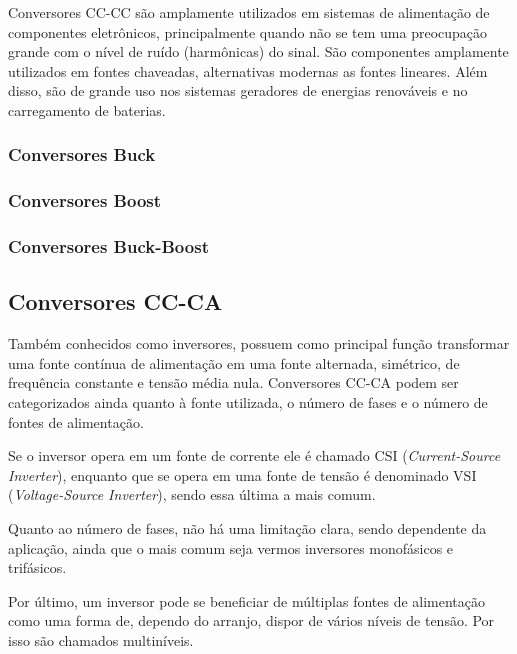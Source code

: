 Conversores CC-CC são amplamente utilizados em sistemas de alimentação de componentes eletrônicos, principalmente quando não se tem uma preocupação grande com o nível de ruído (harmônicas) do sinal. São componentes amplamente utilizados em fontes chaveadas, alternativas modernas as fontes lineares. Além disso, são de grande uso nos sistemas geradores de energias renováveis e no carregamento de baterias.

\subsubsection{Conversores Buck}


 
\subsubsection{Conversores Boost}


 
\subsubsection{Conversores Buck-Boost}


 
\subsection{Conversores CC-CA}

Também conhecidos como inversores, possuem como principal função transformar uma fonte contínua de alimentação em uma fonte alternada, simétrico, de frequência constante e tensão média nula. Conversores CC-CA podem ser categorizados ainda quanto à fonte utilizada, o número de fases e o número de fontes de alimentação.

Se o inversor opera em um fonte de corrente ele é chamado CSI (\emph{Current-Source Inverter}), enquanto que se opera em uma fonte de tensão é denominado VSI (\emph{Voltage-Source Inverter}), sendo essa última a mais comum.

Quanto ao número de fases, não há uma limitação clara, sendo dependente da aplicação, ainda que o mais comum seja vermos inversores monofásicos e trifásicos.

Por último, um inversor pode se beneficiar de múltiplas fontes de alimentação como uma forma de, dependo do arranjo, dispor de vários níveis de tensão. Por isso são chamados multiníveis.

